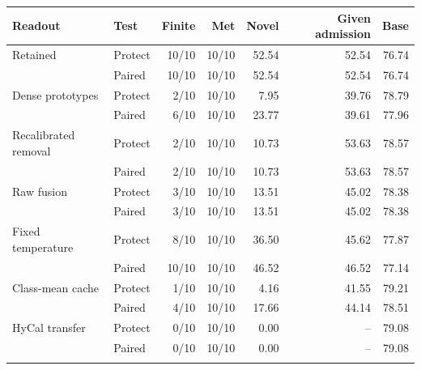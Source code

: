 \begin{tabular}{@{}llrrrrr@{}}
\toprule
Readout & Test & Finite & Met & Novel & Given admission & Base \\
\midrule
Retained & Protect & 10/10 & 10/10 & 52.54 & 52.54 & 76.74 \\
 & Paired & 10/10 & 10/10 & 52.54 & 52.54 & 76.74 \\
\addlinespace[2pt]
Dense prototypes & Protect & 2/10 & 10/10 & 7.95 & 39.76 & 78.79 \\
 & Paired & 6/10 & 10/10 & 23.77 & 39.61 & 77.96 \\
\addlinespace[2pt]
Recalibrated removal & Protect & 2/10 & 10/10 & 10.73 & 53.63 & 78.57 \\
 & Paired & 2/10 & 10/10 & 10.73 & 53.63 & 78.57 \\
\addlinespace[2pt]
Raw fusion & Protect & 3/10 & 10/10 & 13.51 & 45.02 & 78.38 \\
 & Paired & 3/10 & 10/10 & 13.51 & 45.02 & 78.38 \\
\addlinespace[2pt]
Fixed temperature & Protect & 8/10 & 10/10 & 36.50 & 45.62 & 77.87 \\
 & Paired & 10/10 & 10/10 & 46.52 & 46.52 & 77.14 \\
\addlinespace[2pt]
Class-mean cache & Protect & 1/10 & 10/10 & 4.16 & 41.55 & 79.21 \\
 & Paired & 4/10 & 10/10 & 17.66 & 44.14 & 78.51 \\
\addlinespace[2pt]
HyCal transfer & Protect & 0/10 & 10/10 & 0.00 & -- & 79.08 \\
 & Paired & 0/10 & 10/10 & 0.00 & -- & 79.08 \\
\addlinespace[2pt]
\bottomrule
\end{tabular}
